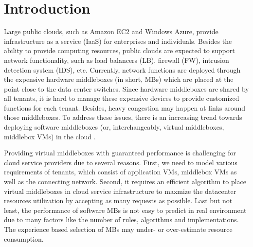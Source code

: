 \documentclass[review]{elsarticle}
\begin{document}
\section{Introduction}
Large public clouds, such as Amazon EC2 and Windows Azure, provide infrastructure as a service (IaaS) for enterprises and individuals. Besides the ability to provide computing resources, public clouds are expected to support network functionality, such as load balancers (LB), firewall (FW), intrusion detection system (IDS), etc. Currently, network functions are deployed through the expensive hardware middleboxes (in short, MBs) which are placed at the point close to the data center switches. %
Since hardware middleboxes are shared by all tenants, it is hard to manage these expensive devices to provide customized functions for each tenant. Besides, heavy congestion may happen at links around those middleboxes. To address these issues, there is an increasing trend towards deploying 
 software middleboxes (or, interchangeably, virtual middleboxes, middlebox VMs) in the cloud \cite{G13dio, stratos12}. %


Providing virtual middleboxes with guaranteed performance is challenging for cloud service providers due to several reasons. First, we need to model various requirements of tenants, which consist of application VMs, middlebox VMs as well as the connecting network. Second, it requires an efficient algorithm to  place virtual middleboxes in cloud service infrastructure to maxmize the datacenter resources utilization by accepting as many requests as possible. Last but not least, 
the performance of software MBs is not easy to predict in real environment due to many factors like the number of rules, algorithms and implementations. The experience based selection of MBs may under- or over-estimate resource consumption.  
\end{document}

